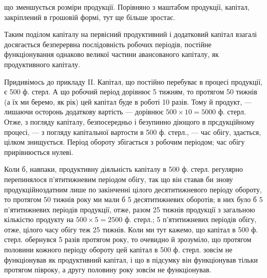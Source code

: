 \parcont{}  %
що зменшується розміри продукції. Порівняно з маштабом продукції, капітал,
закріплений в грошовій формі, тут ще більше зростає.

Таким поділом капіталу на первісний продуктивний і додатковий капітал
взагалі досягається безперервна послідовність робочих періодів, постійне
функціонування однаково великої частини авансованого капіталу,
як продуктивного капіталу.

Придивімось до прикладу II. Капітал, що постійно перебуває в процесі
продукції, є 500 ф. стерл. А що робочий період дорівнює 5 тижням,
то протягом 50 тижнів (а їх ми беремо, як рік) цей капітал буде в
роботі 10 разів. Тому й продукт, — лишаючи осторонь додаткову вартість
— дорівнює $500 × 10 = 5000$ ф.  стерл. Отже, з погляду капіталу,
безпосередньо і безупинно діющого в прсдукційному процесі, — з погляду
капітальної вартости в 500 ф. стерл., — час обігу, здається, цілком
знищується. Період обороту збігається з робочим періодом; час обігу прирівнюється
нулеві.

Коли б, навпаки, продуктивну діяльність капіталу в 500 ф. стерл. регулярно
перепинялося п’ятитижневим періодом обігу, так що він ставав
би знову продукційноздатним лише по закінченні цілого десятитижневого
періоду обороту, то протягом 50 тижнів року ми мали б 5 десятитижневих
оборотів; в них було б 5 п’ятитижневих періодів продукції, отже,
разом 25 тижнів продукції з загальною кількістю продукту на $500 × 5 = 2500$
ф. стерл.; 5 п’ятитижневих періодів обігу, отже, цілого часу обігу теж
25 тижнів. Коли ми тут кажемо, що капітал в 500 ф. стерл. обернувся
5 разів протягом року, то очевидно й зрозуміло, що протягом половини
кожного періоду обороту цей капітал в 500 ф. стерл. зовсім не функціонував
як продуктивний капітал, і що в підсумку він функціонував тільки
протягом півроку, а другу половину року зовсім не функціонував.

